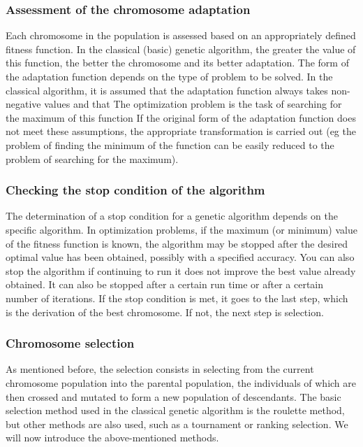 \subsubsection{Assessment of the chromosome adaptation}
Each chromosome in the population is assessed based on an appropriately defined fitness 
function. 
In the classical (basic) genetic algorithm, the greater the value of this function, 
the better the chromosome and its better adaptation. The form of the adaptation function 
depends on the type of problem to be solved. 
In the classical algorithm, it is assumed that the adaptation function always takes 
non-negative values and that The optimization problem is the task of searching for the 
maximum of this function If the original form of the adaptation function does not meet 
these assumptions, the appropriate transformation is carried out (eg the problem of finding 
the minimum of the function can be easily reduced to the problem of searching for the maximum). 

\subsubsection{Checking the stop condition of the algorithm} 
The determination of a stop condition for a genetic algorithm depends on the specific algorithm. 
In optimization problems, if the maximum (or minimum) value of the fitness function is known, 
the algorithm may be stopped after the desired optimal value has been obtained, possibly with 
a specified accuracy. 
You can also stop the algorithm if continuing to run it does not improve the best value 
already obtained. 
It can also be stopped after a certain run time or after a certain number of iterations. 
If the stop condition is met, it goes to the last step, which is the derivation of the best 
chromosome. If not, the next step is selection.

\subsubsection{Chromosome selection} 
As mentioned before, the selection consists in selecting from the current chromosome population into 
the parental population, the individuals of which are then crossed and mutated to form a new 
population of descendants. 
The basic selection method used in the classical genetic algorithm is the roulette method, 
but other methods are also used, such as a tournament or ranking selection. 
We will now introduce the above-mentioned methods. 

